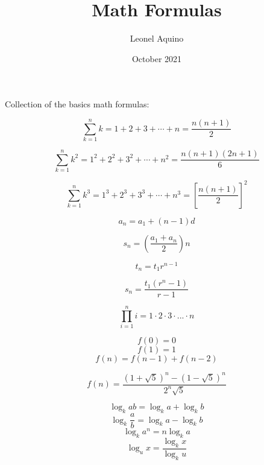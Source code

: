 \documentclass[12pt, letter-paper, two-side]{article}
\title{Math Formulas}
\author{Leonel Aquino}
\date{October 2021}
\begin{document}
\begin{titlepage}
\maketitle
\end{titlepage}

Collection of the basics math formulas:

$$\sum_{k=1}^{n} k = 1 + 2 + 3 + \cdots + n = \frac{n(n+1)}{2}$$

$$\sum_{k=1}^{n} k^2 = 1^2 + 2^2 + 3^2 + \cdots + n^2 = \frac{n(n+1)(2n+1)}{6}$$

$$\sum_{k=1}^{n} k^3 = 1^3 + 2^3 + 3^3 + \cdots + n^3 = \left[\frac{n(n+1)}{2}\right]^2$$

$$a_{n} = a_{1} + (n - 1)d$$

$$s_{n} = (\frac{a_{1} + a_{n}}{2})n$$

$$t_{n} = t_{1}r^{n-1}$$

$$s_{n} = \frac{t_{1}(r^n - 1)}{r -1}$$

$$\prod_{i=1}^{n} i = 1 \cdot 2 \cdot 3 \cdot ... \cdot n$$

$$f(0) = 0$$
$$f(1) = 1$$
$$f(n) = f(n-1) + f(n-2)$$

$$f(n) = \frac{(1+\sqrt{5})^n-(1-\sqrt{5})^n}{2^n\sqrt{5}}$$

$$\log_{k}{ab} = \log_{k}{a} + \log_{k}{b}$$
$$\log_{k}{\frac{a}{b}} = \log_{k}{a} - \log_{k}{b}$$
$$\log_{k}{a^n} = n \log_{k}{a}$$
$$\log_{u}{x} = \frac{\log_{k}{x}}{\log_{k}{u}}$$
\end{document}
